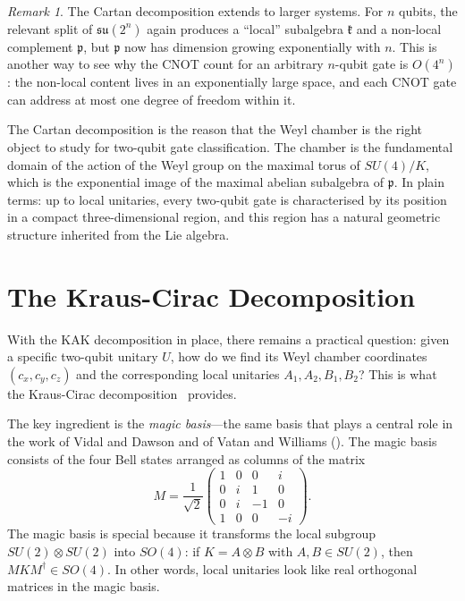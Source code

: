 \documentclass[12pt, a4paper, oneside]{report}
\theoremstyle{plain}
\theoremstyle{definition}
\theoremstyle{remark}
\newtheorem{remark}[theorem]{Remark}
\begin{document}
\begin{remark}
The Cartan decomposition extends to larger systems. For $n$ qubits, the relevant split of
$\mathfrak{su}(2^n)$ again produces a ``local'' subalgebra $\mathfrak{k}$ and a non-local
complement $\mathfrak{p}$, but $\mathfrak{p}$ now has dimension growing exponentially with
$n$. This is another way to see why the CNOT count for an arbitrary $n$-qubit gate is
$O(4^n)$: the non-local content lives in an exponentially large space, and each CNOT gate
can address at most one degree of freedom within it.
\end{remark}

The Cartan decomposition is the reason that the Weyl chamber is the right object to study
for two-qubit gate classification. The chamber is the fundamental domain of the action of
the Weyl group on the maximal torus of $SU(4)/K$, which is the exponential image of the
maximal abelian subalgebra of $\mathfrak{p}$. In plain terms: up to local unitaries, every
two-qubit gate is characterised by its position in a compact three-dimensional region, and
this region has a natural geometric structure inherited from the Lie algebra.


\section{The Kraus-Cirac Decomposition}

With the KAK decomposition in place, there remains a practical question: given a specific
two-qubit unitary $U$, how do we find its Weyl chamber coordinates $(c_x, c_y, c_z)$ and
the corresponding local unitaries $A_1, A_2, B_1, B_2$? This is what the Kraus-Cirac
decomposition~\cite{kraus2001} provides.

The key ingredient is the \emph{magic basis}---the same basis that plays a central role in
the work of Vidal and Dawson and of Vatan and Williams (). The magic
basis consists of the four Bell states arranged as columns of the matrix
\[
  M = \frac{1}{\sqrt{2}}
  \begin{pmatrix}1 & 0 & 0 & i \\ 0 & i & 1 & 0 \\ 0 & i & -1 & 0 \\ 1 & 0 & 0 & -i\end{pmatrix}.
\]
The magic basis is special because it transforms the local subgroup $SU(2) \otimes SU(2)$
into $SO(4)$: if $K = A \otimes B$ with $A, B \in SU(2)$, then $M K M^\dagger \in SO(4)$.
In other words, local unitaries look like real orthogonal matrices in the magic basis.
\end{document}
